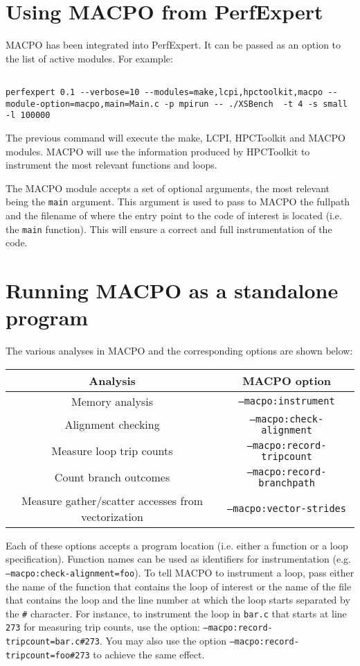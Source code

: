 \section{Using MACPO from PerfExpert}

MACPO has been integrated into PerfExpert. It can be passed as an option to the list of active modules. For example:

\begin{lstlisting}[breaklines]

perfexpert 0.1 --verbose=10 --modules=make,lcpi,hpctoolkit,macpo --module-option=macpo,main=Main.c -p mpirun -- ./XSBench  -t 4 -s small -l 100000

\end{lstlisting}

The previous command will execute the make, LCPI, HPCToolkit and MACPO modules. MACPO will use the information
produced by HPCToolkit to instrument the most relevant functions and loops.

The MACPO module accepts a set of optional arguments, the most relevant being the \texttt{main} argument. This
argument is used to pass to MACPO the fullpath and the filename of where the entry point to the code of interest
is located (i.e. the \texttt{main} function). This will ensure a correct and full instrumentation of the code.


\section{Running MACPO as a standalone program}

The various analyses in MACPO and the corresponding options are shown below:

\begin{tabular}[h]{|c|c|}\hline
\textbf{Analysis} & \textbf{MACPO option} \\\hline
Memory analysis & \texttt{--macpo:instrument} \\\hline
Alignment checking & \texttt{--macpo:check-alignment} \\\hline
Measure loop trip counts & \texttt{--macpo:record-tripcount} \\\hline
Count branch outcomes & \texttt{--macpo:record-branchpath} \\\hline
Measure gather/scatter accesses from vectorization & \texttt{--macpo:vector-strides} \\\hline
\end{tabular}

Each of these options accepts a program location (i.e. either a function or a loop specification). Function names can be used as identifiers for instrumentation (e.g. \texttt{--macpo:check-alignment=foo}). To tell MACPO to instrument a loop, pass either the name of the function that contains the loop of interest or the name of the file that contains the loop and the line number at which the loop starts separated by the \texttt{\#} character. For instance, to instrument the loop in \texttt{bar.c} that starts at line \texttt{273} for measuring trip counts, use the option: \texttt{--macpo:record-tripcount=bar.c\#273}. You may also use the option \texttt{--macpo:record-tripcount=foo\#273} to achieve the same effect.

